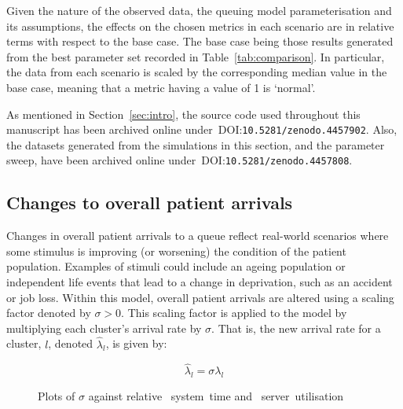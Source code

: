\documentclass[]{interact}
\newlength{\imgwidth}
\theoremstyle{plain}%
\theoremstyle{definition}
\theoremstyle{remark}
\begin{document}
Given the nature of the observed data, the queuing model parameterisation and
its assumptions, the effects on the chosen metrics in each scenario are in
relative terms with respect to the base case. The base case being those results
generated from the best parameter set recorded in Table~\ref{tab:comparison}. In
particular, the data from each scenario is scaled by the corresponding median
value in the base case, meaning that a metric having a value of 1 is `normal'.

As mentioned in Section~\ref{sec:intro}, the source code used throughout
this manuscript has been archived online
under~DOI:\texttt{10.5281/zenodo.4457902}.
Also, the datasets generated from the simulations in this section, and the
parameter sweep, have been archived online
under~DOI:\texttt{10.5281/zenodo.4457808}.


\subsection{Changes to overall patient arrivals}\label{subsec:arrivals}

Changes in overall patient arrivals to a queue reflect real-world scenarios
where some stimulus is improving (or worsening) the condition of the patient
population. Examples of stimuli could include an ageing population or
independent life events that lead to a change in deprivation, such as an
accident or job loss. Within this model, overall patient arrivals are altered
using a scaling factor denoted by \(\sigma > 0\). This scaling factor is applied
to the model by multiplying each cluster's arrival rate by \(\sigma\). That is,
the new arrival rate for a cluster, \(l\), denoted \(\hat\lambda_l\), is given
by:

\begin{equation}\label{eq:lambda}
    \hat\lambda_{l} = \sigma\lambda_l
\end{equation}

\begin{figure}
    \centering

    \caption{%
        Plots of \(\sigma\) against relative
        ~system~time and
        ~server~utilisation
    }\label{fig:lambda}
\end{figure}
\end{document}
